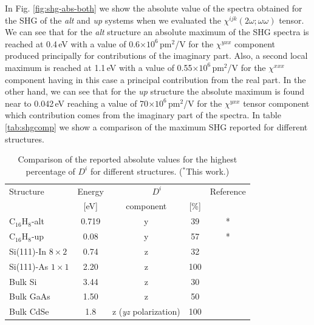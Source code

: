 \documentclass[aps,pra,11pt,tightenlines,showpacs,superscriptaddress,groupedaddress]{revtex4-1}
\newcommand{\di}{$D^{i}$}
\newcommand{\altstc}{C$_{16}$H$_{8}$-alt}
\newcommand{\upstc}{C$_{16}$H$_{8}$-up}
\begin{document}
In Fig. \ref{fig:shg-abs-both}  we show the absolute value of the  spectra obtained
for the SHG of the \emph{alt} and \emph{up} systems when we evaluated the $
\chi^{ijk}(2\omega;\omega\omega) $ tensor. We can see
that for the \emph{alt} structure an absolute
maximum of the SHG spectra is reached at 0.4\,eV with a value of
0.6$\times10^{6} $\,pm$^{2}$/V for the $\chi^{yxx} $ component produced
principally for contributions of the imaginary part. Also, a second local
maximum is reached at 1.1\,eV with a value of 0.55$\times10^{6} $\,pm$^{2}$/V
for the $\chi^{xxx} $ component having in this case a principal contribution
from the real part. In the other hand, we can see that for the
\emph{up} structure the absolute maximum is found near to 0.042\,eV reaching a
value of 70$\times10^{6} $\,pm$^{2}$/V for the $\chi^{yxx} $ tensor component
which contribution comes from the imaginary part of the spectra. In table
\ref{tab:shgcomp} we show a comparison of the maximum SHG reported for
different structures.


\begin{table}
    \caption{Comparison of the reported absolute values for the highest 
    percentage of {\di} for different structures. ($^{*}$This work.)}
    \label{tab:dacomp}
    \centering
    \begin{ruledtabular}
    \begin{tabular}{lcccc}
    Structure & Energy &  \multicolumn{2}{c}{\di} &  Reference\\
    \cline{3-4}
              & [eV]   & component & [\%] \\
    \hline
    {\altstc}               & 0.719 & y & 39 & *     \\
    {\upstc}                & 0.08  & y & 57 & *     \\
    Si(111)-In $8\times2$   & 0.74  & z & 32 & \cite{arzate2014optical}  \\
    Si(111)-As $1\times1$   & 2.20  & z & 100& \cite{mendoza2012optical} \\
    Bulk Si                 & 3.44  & z & 30 & \cite{nastos2007full}     \\
    Bulk GaAs               & 1.50  & z & 50 & \cite{nastos2007full} 
    \cite{bhat2005excitonic} \\
    Bulk CdSe               & 1.8   & z {\scriptsize (\emph{yz} polarization)} 
    & 100& \cite{nastos2007full}\\
    \end{tabular}
    \end{ruledtabular}
\end{table}
\end{document}
